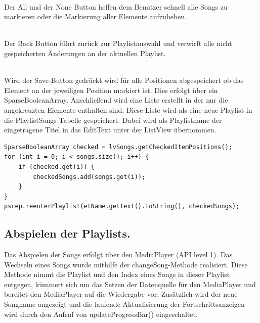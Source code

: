 \documentclass[FIPLY_base.tex]{subfiles}
\begin{document}
\ \\
Der All und der None Button helfen dem Benutzer schnell alle Songs zu markieren oder die Markierung aller Elemente aufzuheben.

\ \\
Der Back Button führt zurück zur Playlistauswahl und verwirft alle nicht gespeicherten Änderungen an der aktuellen Playlist.

\ \\
Wird der Save-Button gedrückt wird für alle Positionen abgespeichert ob das Element an der jeweiligen Position markiert ist. Dies erfolgt über ein SparseBooleanArray. 
Anschließend wird eine Liste erstellt in der nur die angekreuzten Elemente enthalten sind. Diese Liste wird als eine neue Playlist in die PlaylistSongs-Tabelle gespeichert. 
Dabei wird als Playlistname der eingetragene Titel in das EditText unter der ListView übernommen.

\begin{lstlisting}
SparseBooleanArray checked = lvSongs.getCheckedItemPositions();
for (int i = 0; i < songs.size(); i++) {
    if (checked.get(i)) {
        checkedSongs.add(songs.get(i));
    }
}
psrep.reenterPlaylist(etName.getText().toString(), checkedSongs);
\end{lstlisting}



\newpage
\subsection {Abspielen der Playlists.}
\cite{adMediaPlayer}\cite{bMediaPlayer}\cite{wMusicDroid}\cite{yMP3Player}\newline
Das Abspielen der Songs erfolgt über den MediaPlayer (API level 1). \newline
Das Wechseln eines Songs wurde mithilfe der changeSong-Methode realisiert. \newline
Diese Methode nimmt die Playlist und den Index eines Songs in dieser Playlist entgegen, kümmert sich um das Setzen der Datenquelle für den MediaPlayer und bereitet den MediaPlayer auf die Wiedergabe vor. 
Zusätzlich wird der neue Songname angezeigt und die laufende Aktualisierung der Fortschrittsanzeigen wird durch den Aufruf von updateProgressBar() eingeschaltet. 
\end{document}
